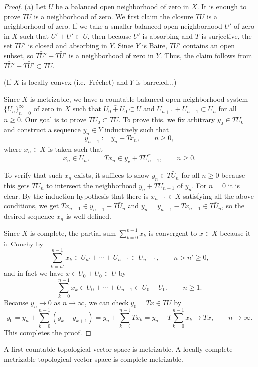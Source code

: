 \documentclass{../../large}
\begin{document}
\begin{proof}
(a)
Let $U$ be a balanced open neighborhood of zero in $X$.
It is enough to prove $TU$ is a neighborhood of zero.
We first claim the closure $\bar{TU}$ is a neighborhood of zero.
If we take a smaller balanced open neighborhood $U'$ of zero in $X$ such that $U'+U'\subset U$, then because $U'$ is absorbing and $T$ is surjective, the set $\bar{TU'}$ is closed and absorbing in $Y$.
Since $Y$ is Baire, $\bar{TU'}$ contains an open subset, so $\bar{TU'}+\bar{TU'}$ is a neighborhood of zero in $Y$.
Thus, the claim follows from $\bar{TU'}+\bar{TU'}\subset\bar{TU}$.

(If $X$ is locally convex (i.e.~Fr\'echet) and $Y$ is barreled...)

Since $X$ is metrizable, we have a countable balanced open neighborhood system $\{U_n\}_{n=0}^\infty$ of zero in $X$ such that $\bar{U_0+U_0}\subset U$ and $U_{n+1}+U_{n+1}\subset U_n$ for all $n\ge0$.
Our goal is to prove $\bar{TU_0}\subset TU$.
To prove this, we fix arbitrary $y_0\in\bar{TU_0}$ and construct a sequence $y_n\in Y$ inductively such that
\[y_{n+1}:=y_n-Tx_n,\qquad n\ge0,\]
where $x_n\in X$ is taken such that
\[x_n\in U_n,\qquad Tx_n\in y_n+\bar{TU_{n+1}},\qquad n\ge0.\]

To verify that such $x_n$ exists, it suffices to show $y_n\in\bar{TU_n}$ for all $n\ge0$ because this gets $TU_n$ to intersect the neighborhood $y_n+\bar{TU_{n+1}}$ of $y_n$.
For $n=0$ it is clear.
By the induction hypothesis that there is $x_{n-1}\in X$ satisfying all the above conditions, we get $Tx_{n-1}\in y_{n-1}+\bar{TU_n}$ and $y_n=y_{n-1}-Tx_{n-1}\in\bar{TU_n}$, so the desired sequence $x_n$ is well-defined.

Since $X$ is complete, the partial sum $\sum_{k=0}^{n-1}x_k$ is convergent to $x\in X$ because it is Cauchy by
\[\sum_{k=n'}^{n-1}x_k\in U_{n'}+\cdots+U_{n-1}\subset U_{n'-1},\qquad n>n'\ge0,\]
and in fact we have $x\in\bar{U_0+U_0}\subset U$ by
\[\sum_{k=0}^{n-1}x_k\in U_0+\cdots+U_{n-1}\subset U_0+U_0,\qquad n\ge1.\]
Because $y_n\to0$ as $n\to\infty$, we can check $y_0=Tx\in TU$ by
\[y_0=y_n+\sum_{k=0}^{n-1}(y_k-y_{k+1})=y_n+\sum_{k=0}^{n-1}Tx_k=y_n+T\sum_{k=0}^{n-1}x_k\to Tx,\qquad n\to\infty.\]
This completes the proof.
\end{proof}

A first countable topological vector space is metrizable.
A locally complete metrizable topological vector space is complete metrizable.
\end{document}

